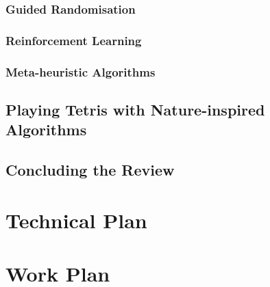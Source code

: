 \documentclass[a4paper, 12pt]{extreport}
\begin{document}
			\subsection{Guided Randomisation}
			
			
			\subsection{Reinforcement Learning}
			
				
				
			\subsection{Meta-heuristic Algorithms}
				
				
					
						
		\section{Playing Tetris with Nature-inspired Algorithms}
		
		
		\section{Concluding the Review}
	
	\chapter{Technical Plan}
	
		
	
	\chapter{Work Plan}
		
\end{document}
